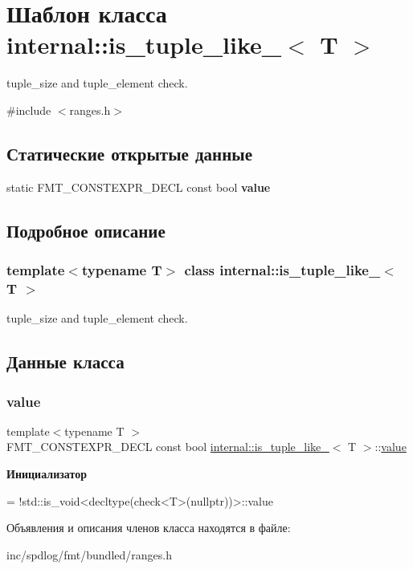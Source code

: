 \hypertarget{classinternal_1_1is__tuple__like__}{}\section{Шаблон класса internal\+:\+:is\+\_\+tuple\+\_\+like\+\_\+$<$ T $>$}
\label{classinternal_1_1is__tuple__like__}


tuple\+\_\+size and tuple\+\_\+element check.  




{\ttfamily \#include $<$ranges.\+h$>$}

\subsection*{Статические открытые данные}
\begin{DoxyCompactItemize}
\item 
static F\+M\+T\+\_\+\+C\+O\+N\+S\+T\+E\+X\+P\+R\+\_\+\+D\+E\+CL const bool {\bfseries value}
\end{DoxyCompactItemize}


\subsection{Подробное описание}
\subsubsection*{template$<$typename T$>$\newline
class internal\+::is\+\_\+tuple\+\_\+like\+\_\+$<$ T $>$}

tuple\+\_\+size and tuple\+\_\+element check. 

\subsection{Данные класса}
\mbox{\label{classinternal_1_1is__tuple__like___a2d78d2520f310397d1bad082dc3e3fa0}} 
\subsubsection{\texorpdfstring{value}{value}}
{\footnotesize\ttfamily template$<$typename T $>$ \\
F\+M\+T\+\_\+\+C\+O\+N\+S\+T\+E\+X\+P\+R\+\_\+\+D\+E\+CL const bool \hyperlink{classinternal_1_1is__tuple__like__}{internal\+::is\+\_\+tuple\+\_\+like\+\_\+}$<$ T $>$\+::\hyperlink{classinternal_1_1value}{value}\hspace{0.3cm}{\ttfamily [static]}}

{\bfseries Инициализатор}
\begin{DoxyCode}
=
      !std::is\_void<decltype(check<T>(\textcolor{keyword}{nullptr}))>::value
\end{DoxyCode}


Объявления и описания членов класса находятся в файле\+:\begin{DoxyCompactItemize}
\item 
inc/spdlog/fmt/bundled/ranges.\+h\end{DoxyCompactItemize}
